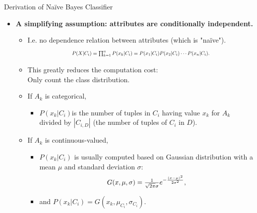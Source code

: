 \begin{frame}{Derivation of Naïve Bayes Classifier}
	\begin{itemize}
		\item \textbf{A simplifying assumption: attributes are {\color{airforceblue}conditionally independent}.}
		      \begin{itemize}
			      \item I.e. no dependence relation between attributes (which is "naïve").
			            \begin{align*}
				            \resizebox{7cm}{!}{%
					            $P(X|C_i) = \prod_{k=1}^{n} P(x_k|C_i) = P(x_1|C_i)P(x_2|C_i)\cdots P(x_n|C_i).$}
			            \end{align*}
			      \item This greatly reduces the computation cost:\\
			            Only count the class distribution.
			      \item If $A_k$ is categorical,
			            \begin{itemize}
				            \item $P(x_k|C_i)$is the number of tuples in $C_i$ having value $x_k$ for $A_k$ \\
				                  divided by $|C_{i,D}|$ (the number of tuples of $C_i$ in $D$).
			            \end{itemize}
			      \item If $A_k$ is continuous-valued,
			            \begin{itemize}
				            \item $P(x_k|C_i)$ is usually computed based on Gaussian distribution with a mean $\mu$ and standard deviation $\sigma$:
				                  \begin{align*}
					                  \resizebox{4cm}{!}{%
					                  $G(x,\mu,\sigma) = \frac{1}{\sqrt{2\pi}\sigma}e^{-\frac{(x-\mu)^2}{2\sigma^2}},$}
				                  \end{align*}
				            \item and $P(x_k|C_i) = G(x_k,\mu_{C_i},\sigma_{C_i})$.
			            \end{itemize}
		      \end{itemize}
	\end{itemize}
\end{frame}

